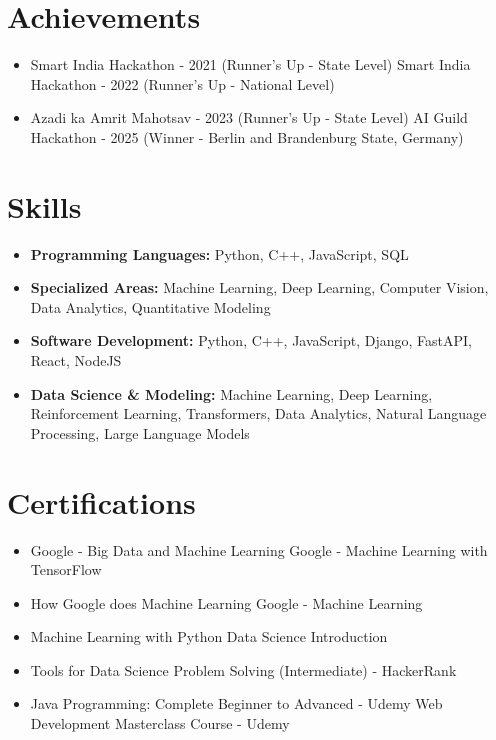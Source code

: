 \documentclass[a4paper,10pt]{article}
\begin{document}
\section*{Achievements}
\begin{itemize}
\item Smart India Hackathon - 2021 (Runner's Up - State Level) \hfill Smart India Hackathon - 2022 (Runner's Up - National Level)
\item Azadi ka Amrit Mahotsav - 2023 (Runner's Up - State Level) \hfill AI Guild Hackathon - 2025 (Winner - Berlin and Brandenburg State, Germany)
\end{itemize}

\section*{Skills}
\begin{itemize}
  \item \textbf{Programming Languages:} Python, C++, JavaScript, SQL
  \item \textbf{Specialized Areas:} Machine Learning, Deep Learning, Computer Vision, Data Analytics, Quantitative Modeling
  \item \textbf{Software Development:} Python, C++, JavaScript, Django, FastAPI, React, NodeJS
  \item \textbf{Data Science \& Modeling:} Machine Learning, Deep Learning, Reinforcement Learning, Transformers, Data Analytics, Natural Language Processing, Large Language Models
\end{itemize}

\section*{Certifications}
\begin{itemize}
\item Google - Big Data and Machine Learning \hfill Google - Machine Learning with TensorFlow
\item How Google does Machine Learning \hfill Google - Machine Learning
\item Machine Learning with Python \hfill Data Science Introduction
\item Tools for Data Science \hfill Problem Solving (Intermediate) - HackerRank
\item Java Programming: Complete Beginner to Advanced - Udemy \hfill Web Development Masterclass Course - Udemy
\end{itemize}
\end{document}
